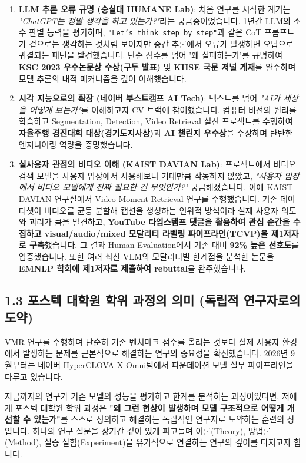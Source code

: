 \documentclass[10pt, a4paper, twocolumn]{article}
\begin{document}
\begin{enumerate}
    \item \textbf{LLM 추론 오류 규명 (숭실대 HUMANE Lab)}: 처음 연구를 시작한 계기는 \textit{"ChatGPT는 정말 생각을 하고 있는가?"}라는 궁금증이었습니다. 1년간 LLM의 소수 판별 능력을 평가하며, \texttt{"Let's think step by step"}과 같은 CoT 프롬프트가 겉으로는 생각하는 것처럼 보이지만 중간 추론에서 오류가 발생하면 오답으로 귀결되는 패턴을 발견했습니다. 단순 점수를 넘어 '왜 실패하는가'를 규명하여 \textbf{KSC 2023 우수논문상 수상(구두 발표)} 및 \textbf{KIISE 국문 저널 게재}를 완주하며 모델 추론의 내적 메커니즘을 깊이 이해했습니다.
    \item \textbf{시각 지능으로의 확장 (네이버 부스트캠프 AI Tech)}: 텍스트를 넘어 \textit{"AI가 세상을 어떻게 보는가"}를 이해하고자 CV 트랙에 참여했습니다. 컴퓨터 비전의 원리를 학습하고 Segmentation, Detection, Video Retrieval 실전 프로젝트를 수행하여 \textbf{자율주행 경진대회 대상(경기도지사상)}과 \textbf{AI 챌린지 우수상}을 수상하며 탄탄한 엔지니어링 역량을 증명했습니다.
    \item \textbf{실사용자 관점의 비디오 이해 (KAIST DAVIAN Lab)}: 프로젝트에서 비디오 검색 모델을 사용자 입장에서 사용해보니 기대만큼 작동하지 않았고, \textit{"사용자 입장에서 비디오 모델에게 진짜 필요한 건 무엇인가?"} 궁금해졌습니다. 이에 KAIST DAVIAN 연구실에서 Video Moment Retrieval 연구를 수행했습니다. 기존 데이터셋이 비디오를 균등 분할해 캡션을 생성하는 인위적 방식이라 실제 사용자 의도와 괴리가 큼을 발견하고, \textbf{YouTube 타임스탬프 댓글을 활용하여 관심 순간을 수집하고 visual/audio/mixed 모달리티 라벨링 파이프라인(TCVP)을 제1저자로 구축}했습니다. 그 결과 Human Evaluation에서 기존 대비 \textbf{92\% 높은 선호도}를 입증했습니다. 또한 여러 최신 VLM의 모달리티별 한계점을 분석한 논문을 \textbf{EMNLP 학회에 제1저자로 제출하여 rebuttal}을 완주했습니다.
\end{enumerate}

\subsection{1.3 포스텍 대학원 학위 과정의 의미 (독립적 연구자로의 도약)}
VMR 연구를 수행하며 단순히 기존 벤치마크 점수를 올리는 것보다 실제 사용자 환경에서 발생하는 문제를 근본적으로 해결하는 연구의 중요성을 확신했습니다. 2026년 9월부터는 네이버 HyperCLOVA X Omni팀에서 파운데이션 모델 실무 파이프라인을 다루고 있습니다.

지금까지의 연구가 기존 모델의 성능을 평가하고 한계를 분석하는 과정이었다면, 저에게 포스텍 대학원 학위 과정은 \textbf{"왜 그런 현상이 발생하며 모델 구조적으로 어떻게 개선할 수 있는가"}를 스스로 정의하고 해결하는 독립적인 연구자로 도약하는 훈련의 장입니다. 하나의 연구 질문을 장기간 깊이 있게 파고들며 이론(Theory), 방법론(Method), 실증 실험(Experiment)을 유기적으로 연결하는 연구의 깊이를 다지고자 합니다.
\end{document}
